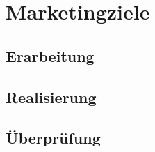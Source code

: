 \section{Marketingziele}
\label{sec:ziele}

\subsection{Erarbeitung}

\subsection{Realisierung}

\subsection{Überprüfung}
